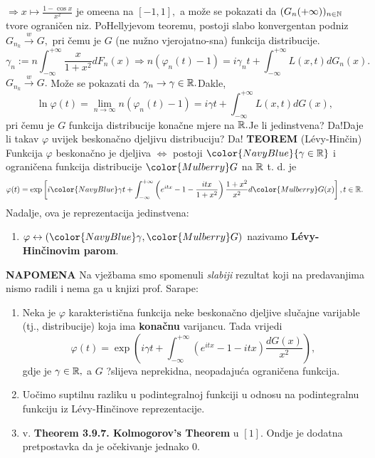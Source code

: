 \documentclass{article}
\begin{document}
\(\Rightarrow x\mapsto\frac{1-\cos x}{x^2}\) je ome\dj{}ena na \([-1,1],\) a može se pokazati da \((G_n(+\infty))_{n\in\Bbb N}\) tvore ograničen niz. Po\newline Hellyjevom teoremu, postoji slabo konvergentan podniz \(G_{n_k}\overset{w}{\longrightarrow}G,\) pri čemu je \(G\) (ne nužno vjerojatno-\newline sna) funkcija distribucije.
\[\gamma_n:=n\int_{-\infty}^{+\infty}\frac{x}{1+x^2}dF_n(x)\Rightarrow n\left(\varphi_n(t)-1\right)=i\gamma_nt+\int_{-\infty}^{+\infty}L(x,t)dG_n(x).\] \(G_{n_k}\overset{w}{\longrightarrow}G.\) Može se pokazati da \(\gamma_n\to\gamma\in\Bbb R.\)\newline Dakle, \[\ln\varphi(t)=\lim_{n\to\infty}n\left(\varphi_n(t)-1\right)=i\gamma t+\int_{-\infty}^{+\infty}L(x,t)dG(x),\] pri čemu je \(G\) funkcija distribucije konačne mjere na \(\Bbb R.\)\newline Je li jedinstvena? Da!\newline Daje li takav \(\varphi\) uvijek beskonačno djeljivu distribuciju? Da!\newline\newline
\textbf{TEOREM} (L\'evy-Hinčin)\newline
Funkcija \(\varphi\) beskonačno je djeljiva \(\Leftrightarrow\) postoji \(\color{NavyBlue}{\gamma\in\Bbb R}\) i ograničena funkcija distribucije \({\color{Mulberry}G}\) na \(\Bbb R\) t. d. je \[\varphi(t)=\exp\left[i{\color{NavyBlue}\gamma}t+\int_{-\infty}^{+\infty}\left(e^{itx}-1-\frac{itx}{1+x^2}\right)\frac{1+x^2}{x^2}d{\color{Mulberry}G}(x)\right],t\in\Bbb R.\] Nadalje, ova je reprezentacija jedinstvena:
\begin{enumerate}
    \item[] \(\varphi\leftrightarrow({\color{NavyBlue}\gamma}, {\color{Mulberry}G})\) nazivamo \textbf{L\'evy-Hinčinovim parom}. 
\end{enumerate}
\textbf{NAPOMENA}\newline
Na vježbama smo spomenuli \emph{slabiji} rezultat koji na predavanjima nismo radili i nema ga u knjizi prof. Sarape:
\begin{enumerate}
    \item[\ding{113}] Neka je \(\varphi\) karakteristična funkcija neke beskonačno djeljive slučajne varijable (tj., distribucije) koja ima \textbf{konačnu} varijancu. Tada vrijedi \[\varphi(t)=\exp\left(i\gamma t+\int_{-\infty}^{+\infty}\left(e^{itx}-1-itx\right)\frac{dG(x)}{x^2}\right),\] gdje je \(\gamma\in\Bbb R,\) a \(G\) \textcolor{WildStrawberry}{?}slijeva neprekidna, neopadajuća ograničena funkcija.
    \item[\ding{228}] Uočimo suptilnu razliku u podintegralnoj funkciji u odnosu na podintegralnu funkciju iz L\'evy-Hinčinove reprezentacije.
    \item[\ding{228}] v. \textbf{Theorem 3.9.7. Kolmogorov's Theorem} u \([1].\) Ondje je dodatna pretpostavka da je očekivanje jednako \(0.\)
\end{enumerate}
\end{document}
